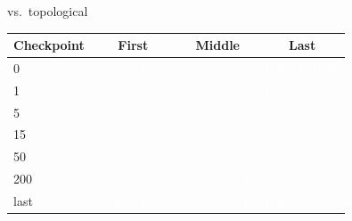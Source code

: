 \begin{table}[H]
\begin{minipage}{0.34\textwidth}
\centering
\footnotesize vs.\ topological\\[3pt]
\renewcommand{\arraystretch}{1.2}
\begin{tabular}{lccc}
\toprule
Checkpoint & First & Middle & Last \\
\midrule
0 & \cellcolor{tabglobalgeneralunnorm0}\textcolor{white}{$0.437 \pm 0.041$} & \cellcolor{tabglobalgeneralunnorm1}\textcolor{white}{$0.472 \pm 0.047$} & \cellcolor{tabglobalgeneralunnorm2}\textcolor{white}{$0.463 \pm 0.040$} \\
1 & \cellcolor{tabglobalgeneralunnorm3}\textcolor{white}{$0.442 \pm 0.042$} & \cellcolor{tabglobalgeneralunnorm4}\textcolor{white}{$0.505 \pm 0.047$} & \cellcolor{tabglobalgeneralunnorm5}\textcolor{white}{$0.491 \pm 0.045$} \\
5 & \cellcolor{tabglobalgeneralunnorm6}\textcolor{white}{$0.453 \pm 0.040$} & \cellcolor{tabglobalgeneralunnorm7}\textcolor{white}{$0.554 \pm 0.051$} & \cellcolor{tabglobalgeneralunnorm8}\textcolor{white}{$0.534 \pm 0.045$} \\
15 & \cellcolor{tabglobalgeneralunnorm1}\textcolor{white}{$0.473 \pm 0.040$} & \cellcolor{tabglobalgeneralunnorm9}\textcolor{white}{$0.560 \pm 0.037$} & \cellcolor{tabglobalgeneralunnorm10}\textcolor{white}{$0.526 \pm 0.037$} \\
50 & \cellcolor{tabglobalgeneralunnorm11}\textcolor{white}{$0.464 \pm 0.038$} & \cellcolor{tabglobalgeneralunnorm8}\textcolor{white}{$0.532 \pm 0.048$} & \cellcolor{tabglobalgeneralunnorm12}\textcolor{white}{$0.502 \pm 0.040$} \\
200 & \cellcolor{tabglobalgeneralunnorm13}\textcolor{white}{$0.460 \pm 0.039$} & \cellcolor{tabglobalgeneralunnorm4}\textcolor{white}{$0.506 \pm 0.047$} & \cellcolor{tabglobalgeneralunnorm14}\textcolor{white}{$0.469 \pm 0.032$} \\
last & \cellcolor{tabglobalgeneralunnorm13}\textcolor{white}{$0.460 \pm 0.039$} & \cellcolor{tabglobalgeneralunnorm4}\textcolor{white}{$0.505 \pm 0.047$} & \cellcolor{tabglobalgeneralunnorm14}\textcolor{white}{$0.469 \pm 0.030$} \\

\end{tabular}
\end{minipage}
\end{table}
